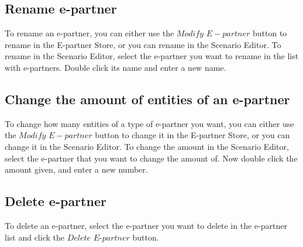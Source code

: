 \documentclass[a4paper]{article}
\begin{document}
\subsection{Rename e-partner}
To rename an e-partner, you can either use the $Modify$ $E-partner$ button to rename in the E-partner Store, or you can rename in the Scenario Editor. To rename in the Scenario Editor, select the e-partner you want to rename in the list with e-partners. Double click its name and enter a new name.

\subsection{Change the amount of entities of an e-partner}
To change how many entities of a type of e-partner you want, you can either use the $Modify$ $E-partner$ button to change it in the E-partner Store, or you can change it in the Scenario Editor. To change the amount in the Scenario Editor, select the e-partner that you want to change the amount of. Now double click the amount given, and enter a new number.

\subsection{Delete e-partner}
To delete an e-partner, select the e-partner you want to delete in the e-partner list and click the $Delete$ $E$-$partner$ button.
\end{document}
